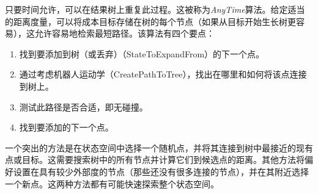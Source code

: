 
只要时间允许，可以在结果树上重复此过程。这被称为\emph{AnyTime}算法。给定适当的距离度量，可以将成本目标存储在树的每个节点（如果从目标开始生长树更容易），这允许容易地检索最短路径。该算法有四个要点：

\begin{enumerate}

\item 找到要添加到树（或丢弃）（StateToExpandFrom）的下一个点。
\item 通过考虑机器人运动学（CreatePathToTree），找出在哪里和如何将该点连接到树上。
\item 测试此路径是否合适，即无碰撞。
\item 找到要添加的下一个点。
\end{enumerate}


一个突出的方法是在状态空间中选择一个随机点，并将其连接到树中最接近的现有点或目标。这需要搜索树中的所有节点并计算它们到候选点的距离。其他方法将偏好设置在具有较少外部度的节点（那些还没有很多连接的节点），并在其附近选择一个新点。这两种方法都有可能快速探索整个状态空间。


